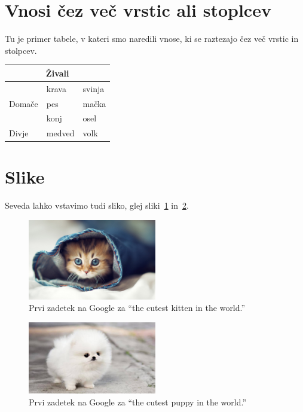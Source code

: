 \documentclass{article}
\begin{document}
\section{Vnosi čez več vrstic ali stoplcev}
\label{sec:vnosi-ez-ve}

Tu je primer tabele, v kateri smo naredili vnose, ki se raztezajo čez več vrstic in stolpcev.

\begin{center}
\begin{tabular}{lll}
  \toprule
  \multicolumn{3}{c}{Živali} \\ \midrule
  \multirow{3}{*}{Domače} & krava & svinja \\
                          & pes & mačka \\
                          & konj & osel \\
  Divje                   & medved & volk \\ \bottomrule
\end{tabular}
\end{center}

\section{Slike}
\label{sec:slike}

Seveda lahko vstavimo tudi sliko, glej sliki~\ref{fig:muca} in~\ref{fig:kuza}.

\begin{figure}[!ht]
  \centering
  \includegraphics[width=0.5\textwidth]{muca.jpg}
  \caption{Prvi zadetek na Google za ``the cutest kitten in the world.''}
  \label{fig:muca}
\end{figure}

\begin{figure}[ht]
  \centering
  \includegraphics[width=0.5\textwidth]{kuza.jpg}
  \caption{Prvi zadetek na Google za ``the cutest puppy in the world.''}
  \label{fig:kuza}
\end{figure}
\end{document}
